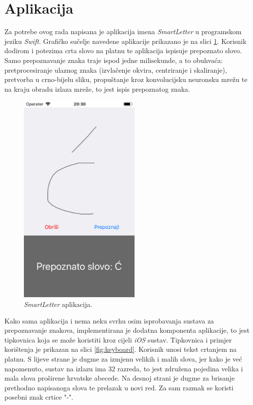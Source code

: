 \section{Aplikacija}

Za potrebe ovog rada napisana je aplikacija imena \emph{SmartLetter} u programskom jeziku \emph{Swift}. Grafičko sučelje navedene aplikacije prikazano je na slici \ref{fig:app}. Korisnik dodirom i potezima crta slovo na platnu te aplikacija ispisuje prepoznato slovo. Samo prepoznavanje znaka traje ispod jedne milisekunde, a to obuhvaća: pretprocesiranje ulaznog znaka (izvlačenje okvira, centriranje i skaliranje), pretvorba u crno-bijelu sliku, propuštanje kroz konvolucijsku neuronsku mrežu te na kraju obradu izlaza mreže, to jest ispis prepoznatog znaka.

\begin{figure}[htb]
    \centering
    \includegraphics[width=6cm]{images/app2.png}
    \caption{\emph{SmartLetter} aplikacija.}
    \label{fig:app}
\end{figure}

Kako sama aplikacija i nema neku svrhu osim isprobavanja sustava za prepoznavanje znakova, implementirana je dodatna komponenta aplikacije, to jest tipkovnica koja se može koristiti kroz cijeli \emph{iOS} sustav. Tipkovnica i primjer korištenja je prikazan na slici \ref{fig:keyboard}. Korisnik unosi tekst crtanjem na platnu. S lijeve strane je dugme za izmjenu velikih i malih slova, jer kako je već napomenuto, sustav na izlazu ima $32$ razreda, to jest združena pojedina velika i mala slova proširene hrvatske abecede. Na desnoj strani je dugme za brisanje prethodno napisanoga slova te prelazak u novi red. Za sam razmak se koristi posebni znak crtice "-".

